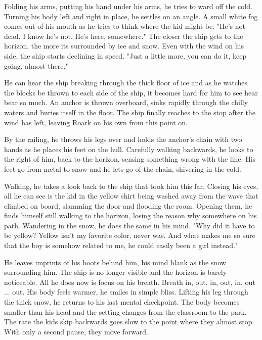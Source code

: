         Folding his arms, putting his hand under his arms, he tries to ward off the cold. Turning his body left and right in place, he settles on
    an angle. A small white fog comes out of his mouth as he tries to think where the kid might be. "He's not dead. I know he's not. He's
    here, somewhere." The closer the ship gets to the horizon, the more its surrounded by ice and snow. Even with the wind on his side, the ship
    starts declining in speed. "Just a little more, you can do it, keep going, almost there."

        He can hear the ship breaking through the thick floor of ice and as he watches the blocks be thrown to each side of the ship, it becomes 
    hard for him to see hear bear so much. An anchor is thrown overboard, sinks rapidly through the chilly waters and buries itself in the 
    floor. The ship finally reaches to the stop after the wind has left, leaving Roark on his own from this point on.

        By the railing, he throws his legs over and holds the anchor's chain with two hands as he places his feet on the hull. Carefully walking
    backwards, he looks to the right of him, back to the horizon, sensing something wrong with the line. His feet go from metal to snow and he
    lets go of the chain, shivering in the cold.

        Walking, he takes a look back to the ship that took him this far. Closing his eyes, all he can see is the kid in the yellow shirt
    being washed away from the wave that climbed on board, slamming the door and flooding the room. Opening them, he finds himself still walking
    to the horizon, losing the reason why somewhere on his path. Wandering in the snow, he does the same in his mind. "Why did it have to be
    yellow? Yellow isn't my favorite color, never was. And what makes me so sure that the boy is somehow related to me, he could easily been a
    girl instead." 

        He leaves imprints of his boots behind him, his mind blank as the snow surrounding him. The ship is no longer visible and the horizon
    is barely noticeable. All he does now is focus on his breath. Breath in, out, in, out, in, out ... out. His body feels warmer, he smiles
    in simple bliss. Lifting his leg through the thick snow, he returns to his last mental checkpoint. The body becomes smaller than his head
    and the setting changes from the classroom to the park. The rate the kids skip backwards goes slow to the point where they almost stop. 
    With only a second pause, they move forward.

